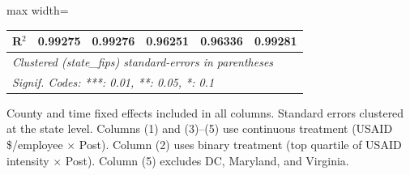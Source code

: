 \begin{table}[htbp]
\begin{adjustbox}{max width=\textwidth}
\begin{tabular}{lccccc}
      R$^2$                            & 0.99275                        & 0.99276        & 0.96251                       & 0.96336                 & 0.99281\\  
      \midrule \midrule
      \multicolumn{6}{l}{\emph{Clustered (state\_fips) standard-errors in parentheses}}\\
      \multicolumn{6}{l}{\emph{Signif. Codes: ***: 0.01, **: 0.05, *: 0.1}}\\
   \end{tabular}
   \end{adjustbox}

   \par \raggedright 
   County and time fixed effects included in all columns. Standard errors clustered at the state level. Columns (1) and (3)--(5) use continuous treatment (USAID \$/employee $\times$ Post). Column (2) uses binary treatment (top quartile of USAID intensity $\times$ Post). Column (5) excludes DC, Maryland, and Virginia.
\end{table}


